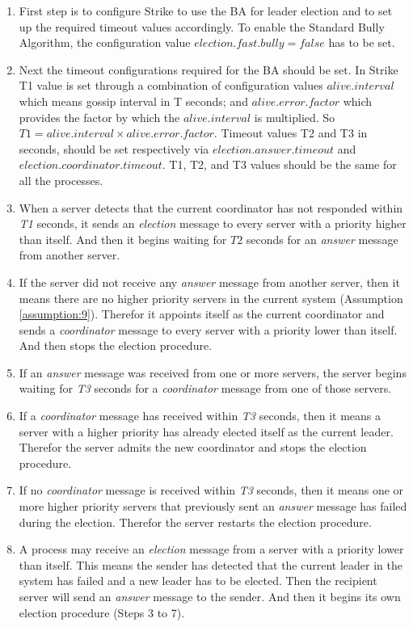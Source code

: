 \documentclass[dareport.tex]{subfiles}
\begin{document}
\begin{enumerate}[leftmargin=*]
	\item First step is to configure Strike to use the BA for leader election and to set up the required timeout values accordingly. To enable the Standard Bully Algorithm, the configuration value $election.fast.bully=false$ has to be set.
	\item Next the timeout configurations required for the BA should be set. In Strike T1 value is set through a combination of configuration values $ alive.interval $ which means gossip interval in T seconds; and $ alive.error.factor $ which provides the factor by which the $ alive.interval $ is multiplied. So $ T1= alive.interval \times alive.error.factor $. Timeout values T2 and T3 in seconds, should be set respectively via $ election.answer.timeout $ and $ election.coordinator.timeout $. T1, T2, and T3 values should be the same for all the processes.
	\item When a server detects that the current coordinator has not responded within \emph{T1} seconds, it sends an \emph{election} message to every server with a priority higher than itself. And then it begins waiting for $ T2 $ seconds for an \emph{answer} message from another server.
	\item If the server did not receive any \emph{answer} message from another server, then it means there are no higher priority servers in the current system (Assumption \ref{assumption:9}). Therefor it appoints itself as the current coordinator and sends a \emph{coordinator} message to every server with a priority lower than itself. And then stops the election procedure.
	\item If an \emph{answer} message was received from one or more servers, the server begins waiting for \emph{T3} seconds for a \emph{coordinator} message from one of those servers.
	\item If a \emph{coordinator} message has received within \emph{T3} seconds, then it means a server with a higher priority has already elected itself as the current leader. Therefor the server admits the new coordinator and stops the election procedure.
	\item If no \emph{coordinator} message is received within \emph{T3} seconds, then it means one or more higher priority servers that previously sent an \emph{answer} message has failed during the election. Therefor the server restarts the election procedure.
	\item A process may receive an \emph{election} message from a server with a priority lower than itself. This means the sender has detected that the current leader in the system has failed and a new leader has to be elected. Then the recipient server will send an \emph{answer} message to the sender. And then it begins its own election procedure (Steps 3 to 7).

\end{enumerate}
\end{document}
